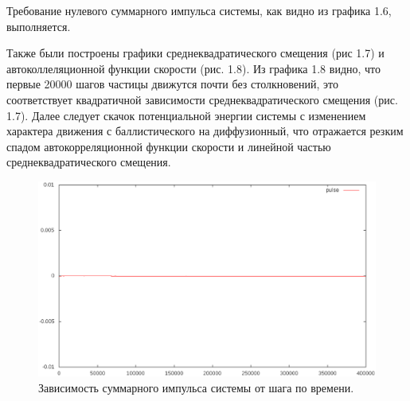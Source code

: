 \documentclass[14pt,a4paper,report]{ncc}
\begin{document}
Требование нулевого суммарного импульса системы, как видно из графика 1.6, выполняется.
\

Также были построены графики среднеквадратического смещения (рис 1.7) и автоколлеляционной функции скорости (рис. 1.8). Из графика 1.8 видно, что первые 20000 шагов частицы движутся почти без столкновений, это соответствует квадратичной зависимости среднеквадратического смещения (рис. 1.7). Далее следует скачок потенциальной энергии системы с изменением характера движения с баллистического на диффузионный, что отражается резким спадом автокорреляционной функции скорости и линейной частью среднеквадратического смещения.
\
\begin{figure}[h!]
\includegraphics[scale=0.6]{pulse400eps}
\caption{Зависимость суммарного импульса системы от шага по времени.}
\end{figure}
\end{document}
